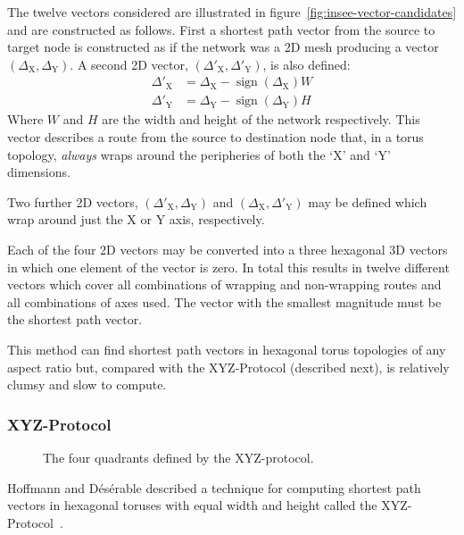 				The twelve vectors considered are illustrated in
				figure~\ref{fig:insee-vector-candidates} and are constructed as
				follows.  First a shortest path vector from the source to target node
				is constructed as if the network was a 2D mesh producing a vector
				$(\Delta_\textrm{X},\Delta_\textrm{Y})$. A second 2D vector,
				$(\Delta'_\textrm{X},\Delta'_\textrm{Y})$, is also defined:
				\begin{align*}
					\Delta'_\textrm{X} &= \Delta_\textrm{X} - \operatorname{sign}(\Delta_\textrm{X})W
					\\
					\Delta'_\textrm{Y} &= \Delta_\textrm{Y} - \operatorname{sign}(\Delta_\textrm{Y})H
				\end{align*}
				Where $W$ and $H$ are the width and height of the network respectively.
				This vector describes a route from the source to destination node that,
				in a torus topology, \emph{always} wraps around the peripheries of both
				the `X' and `Y' dimensions.
				
				Two further 2D vectors, $(\Delta'_\textrm{X},\Delta_\textrm{Y})$ and
				$(\Delta_\textrm{X},\Delta'_\textrm{Y})$ may be defined which wrap around
				just the X or Y axis, respectively.
				
				Each of the four 2D vectors may be converted into a three hexagonal 3D
				vectors in which one element of the vector is zero. In total this
				results in twelve different vectors which cover all combinations of
				wrapping and non-wrapping routes and all combinations of axes used. The
				vector with the smallest magnitude must be the shortest path vector.
				
				This method can find shortest path vectors in hexagonal torus
				topologies of any aspect ratio but, compared with the XYZ-Protocol
				(described next), is relatively clumsy and slow to compute.
			
			\subsubsection{XYZ-Protocol}
				
				\begin{figure}
					\center
					
					\caption{The four quadrants defined by the XYZ-protocol.}
					\label{fig:xyz-protocol-regions}
				\end{figure}
			
				Hoffmann and D\'es\'erable described a technique for computing shortest
				path vectors in hexagonal toruses with equal width and height called
				the XYZ-Protocol~\cite{hoffmann15,hoffmann11}.
				

